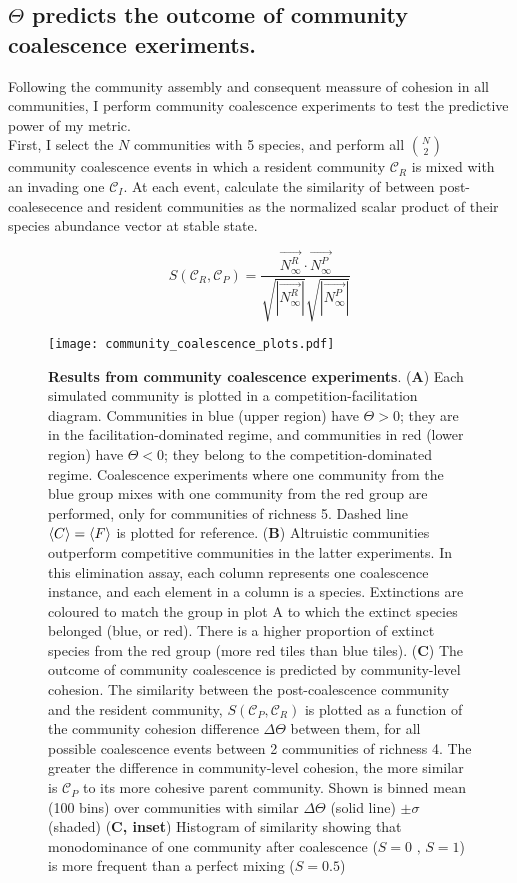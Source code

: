 \documentclass[titlepage,11pt]{article}
\begin{document}
\begin{linenumbers}
			\subsection{$ \Theta $ predicts the outcome of community coalescence exeriments.}
			Following the community assembly and consequent meassure of cohesion in all communities, I perform community coalescence experiments to test the predictive power of my metric.\\
			First, I select the $ N $ communities with 5 species, and perform all $ {N}\choose{2} $ community coalescence events in which a resident community $\mathcal{C}_R$ is mixed with an invading one $ \mathcal{C}_I $. At each event, calculate the similarity of between post-coalesecence  and resident communities as the normalized scalar product of their species abundance vector at stable state.
			\begin{linenomath*}
				\begin{equation}
				S(\mathcal{C}_R, \mathcal{C}_P) = \frac{\vec{N^R_{\infty}} \cdot \vec{N^P_{\infty}}}{\sqrt{|\vec{N^R_{\infty}}|}\sqrt{|\vec{N^P_{\infty}}|}}
				\end{equation}
			\end{linenomath*}
			\begin{figure}
				\centering			
				\texttt{[image: community\_coalescence\_plots.pdf]}
				\caption{\textbf{Results from community coalescence experiments}. (\textbf{A}) Each simulated community is plotted in a competition-facilitation diagram. Communities in blue (upper region) have $ \Theta > 0 $; they are in the facilitation-dominated regime, and communities in red  (lower region) have $ \Theta <0 $; they belong to the competition-dominated regime. Coalescence experiments where one community from the blue group mixes with one community from the red group are performed, only for communities of richness 5. Dashed line $ \braket{C} = \braket{F} $ is plotted for reference. (\textbf{B}) Altruistic communities outperform competitive communities in the latter experiments. In this elimination assay, each column represents one coalescence instance, and each element in a column is a species. Extinctions are coloured to match the group in plot A to which the extinct species belonged (blue, or red). There is a higher proportion of extinct species from the red group (more red tiles than blue tiles). (\textbf{C}) The outcome of community coalescence is predicted by community-level cohesion. The similarity between the post-coalescence community and the resident community, $ S (\mathcal{C}_P, \mathcal{C}_R) $ is plotted as a function of the community cohesion difference $ \Delta \Theta $ between them, for all possible coalescence events between 2 communities of richness 4. The greater the difference in community-level cohesion, the more similar is $ \mathcal{C}_P $ to its more cohesive parent community. Shown is binned mean (100 bins) over communities with similar $ \Delta \Theta $ (solid line) $ \pm \sigma $ (shaded) (\textbf{C, inset}) Histogram of similarity showing that monodominance of one community after coalescence  ($ S = 0 \text{ , } S = 1 $) is more frequent than a perfect mixing ($ S = 0.5 $) }

\end{figure}
\end{linenumbers}
\end{document}
